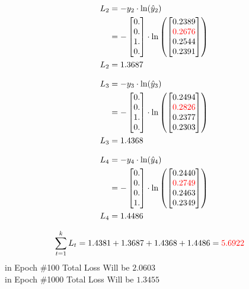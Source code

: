 \documentclass{article}
\begin{document}
\begin{align*}
    L_2 &= -y_2 \cdot \ln(\hat{y}_2) \\
    &= -\begin{bmatrix} 0. \\ 0. \\ 1. \\ 0. \end{bmatrix} \cdot \ln\left(\begin{bmatrix} 0.2389 \\ \textcolor{red}{0.2676} \\ 0.2544 \\ 0.2391 \end{bmatrix}\right) \\
    L_2 &= 1.3687
\end{align*}

\begin{align*}
    L_3 &= -y_3 \cdot \ln(\hat{y}_3) \\
    &= -\begin{bmatrix} 0. \\ 0. \\ 1. \\ 0. \end{bmatrix} \cdot \ln\left(\begin{bmatrix} 0.2494 \\ \textcolor{red}{0.2826} \\ 0.2377 \\ 0.2303 \end{bmatrix}\right) \\
    L_3 &= 1.4368
\end{align*}

\begin{align*}
    L_4 &= -y_4 \cdot \ln(\hat{y}_4) \\
    &= -\begin{bmatrix} 0. \\ 0. \\ 0. \\ 1. \end{bmatrix} \cdot \ln\left(\begin{bmatrix} 0.2440 \\ \textcolor{red}{0.2749} \\ 0.2463 \\ 0.2349 \end{bmatrix}\right) \\
    L_4 &= 1.4486
\end{align*}

\begin{align*}
    \sum_{t=1}^k L_t & = 1.4381 + 1.3687 + 1.4368 + 1.4486 = \textcolor{red}{5.6922}
\end{align*}
in Epoch \#100 Total Loss Will be  $2.0603$\\
in Epoch \#1000 Total Loss Will be $1.3455$
\end{document}
